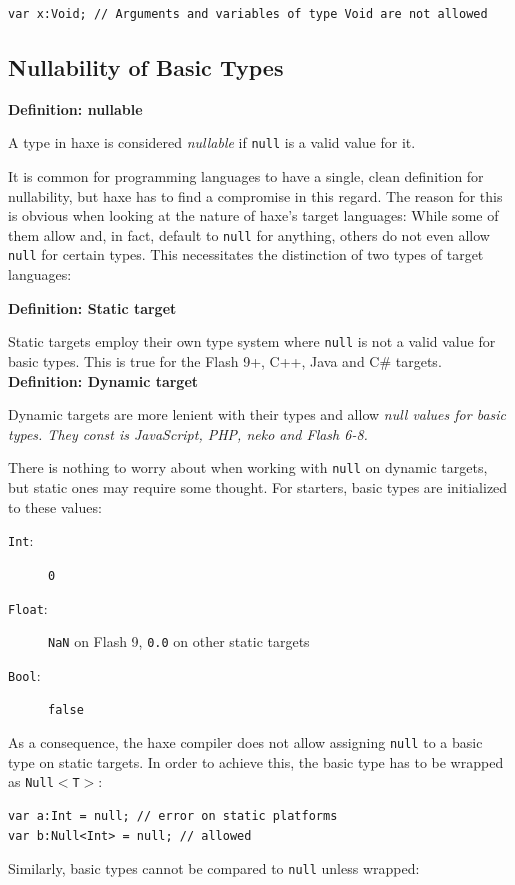 \documentclass{article}
\newcommand{\target}[1]{#1}
\newcommand{\type}[1]{\texttt{#1}}
\newcommand{\expr}[1]{\texttt{#1}}
\newenvironment{myshaded}
  {\def\FrameCommand{\fboxsep=\topsep\colorbox{bgcolor}}%
  \MakeFramed {\advance\hsize-\width \FrameRestore}}%
 {\endMakeFramed}
\newcommand{\define}[3][Definition]
	{\begin{myshaded}\noindent\textbf{#1: #2}\par\nobreak\noindent\ignorespaces#3\label{def:#2}\end{myshaded}}
\begin{document}
\begin{lstlisting}
var x:Void; // Arguments and variables of type Void are not allowed
\end{lstlisting}




\subsection{Nullability of Basic Types}
\label{Nullability}

\define{nullable}{A type in haxe is considered \emph{nullable} if \expr{null} is a valid value for it.}

It is common for programming languages to have a single, clean definition for nullability, but haxe has to find a compromise in this regard. The reason for this is obvious when looking at the nature of haxe's target languages: While some of them allow and, in fact, default to \expr{null} for anything, others do not even allow \expr{null} for certain types. This necessitates the distinction of two types of target languages:

\define{Static target}{Static targets employ their own type system where \expr{null} is not a valid value for basic types. This is true for the \target{Flash 9+}, \target{C++}, \target{Java} and \target{C\#} targets.}
\define{Dynamic target}{Dynamic targets are more lenient with their types and allow \it{null} values for basic types. They const is \target{JavaScript}, \target{PHP}, \target{neko} and \target{Flash 6-8}.}

There is nothing to worry about when working with \expr{null} on dynamic targets, but static ones may require some thought. For starters, basic types are initialized to these values:

\begin{description}
	\item[\type{Int}:] \expr{0}
	\item[\type{Float}:] \expr{NaN} on \target{Flash 9}, \expr{0.0} on other static targets
	\item[\type{Bool}:] \expr{false}
\end{description}
As a consequence, the haxe compiler does not allow assigning \expr{null} to a basic type on static targets. In order to achieve this, the basic type has to be wrapped as \type{Null$<$T$>$}:

\begin{lstlisting}
var a:Int = null; // error on static platforms
var b:Null<Int> = null; // allowed
\end{lstlisting}
Similarly, basic types cannot be compared to \expr{null} unless wrapped:
\end{document}
